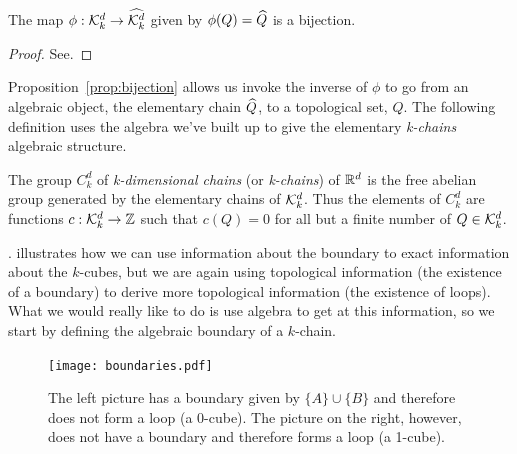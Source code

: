 \begin{prop} \label{prop:bijection}
	The map $\phi : \mathcal{K}^{d}_k \rightarrow \widehat{\mathcal{K}^{d}_k}$ given by $\phi(Q) = \widehat{Q}$ is a bijection.
\end{prop}

\begin{proof}
	See.
\end{proof}

Proposition~\ref{prop:bijection} allows us invoke the inverse of $\phi$ to go from an algebraic object, the elementary chain $\widehat{Q}$, to a topological set, $Q$. The following definition uses the algebra we've built up to give the elementary \textit{k-chains} algebraic structure.

\begin{defn}
	The group $C_k^d$ of \textit{k-dimensional chains} (or \textit{k-chains}) of $\mathbb{R}^d$ is the free abelian group generated by the elementary chains of $\mathcal{K}^{d}_k$. Thus the elements of $C_k^d$ are functions $c : \mathcal{K}^{d}_k \rightarrow \mathbb{Z}$ such that $c(Q) = 0$ for all but a finite number of $Q \in \mathcal{K}^{d}_k$.
\end{defn}

.  illustrates how we can use information about the boundary to exact information about the $k$-cubes, but we are again using topological information (the existence of a boundary) to derive more topological information (the existence of loops). What we would really like to do is use algebra to get at this information, so we start by defining the algebraic boundary of a $k$-chain.

\begin{figure}[htbp]
\begin{center}
\texttt{[image: boundaries.pdf]}
\caption{\label{fig:boundaries} The left picture has a boundary given by $\{ A \} \cup \{ B \}$ and therefore does not form a loop (a 0-cube). The picture on the right, however, does not have a boundary and therefore forms a loop (a 1-cube).}
\end{center}
\end{figure}











